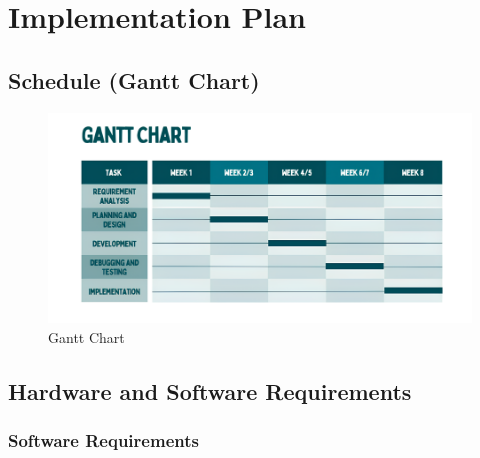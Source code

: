 \chapter{Implementation Plan}


\section{Schedule (Gantt Chart)}
	
	\begin{figure}[h]
	 \centering
	\includegraphics[width=\textwidth]{images/Gantt_chart.png}
	\caption{ Gantt Chart}
	
	\end{figure}
	
	\pagebreak
	\section{Hardware and Software Requirements}
	\subsection{Software Requirements}
